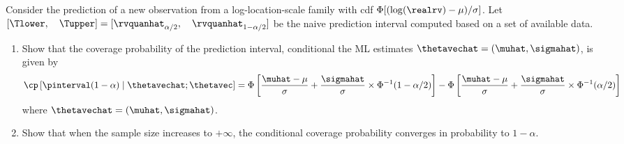 \begin{exercise1}
Consider the prediction of a new observation from a log-location-scale
family with cdf $\Phi[(\log(\realrv)-\mu)/\sigma]$.  Let $[
\Tlower, \quad \Tupper ]=
[\rvquanhat_{\alpha/2},\quad \rvquanhat_{1-\alpha/2}]$ be the naive
prediction interval computed based on a set of available data.
\begin{enumerate}
\item
Show that the coverage probability of the prediction interval,
conditional the ML estimates $\thetavechat=(\muhat,\sigmahat)$, is
given by
\begin{displaymath}
\cp \left [ \pinterval(1-\alpha) \mid \thetavechat ; \thetavec \right ]=
\Phi\left [
 \frac{ \muhat-\mu } { \sigma } +\frac{ \sigmahat } { \sigma } \times
\Phi^{-1}(1-\alpha/2)   
     \right ] -
\Phi\left [
 \frac{ \muhat-\mu } { \sigma } +\frac{ \sigmahat } { \sigma } \times
\Phi^{-1}(\alpha/2)  
     \right ]
\end{displaymath}
where $\thetavechat=(\muhat, \sigmahat)$.
\item
Show that when the sample size increases to $+\infty$, the
conditional coverage probability converges in probability to
$1-\alpha$.
\end{enumerate}
\end{exercise1}

